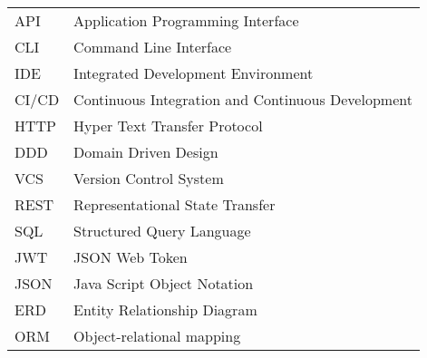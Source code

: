 \begin{longtable}{p{3cm}p{10cm}}
    API&Application Programming Interface\\
    CLI&Command Line Interface\\
    IDE&Integrated Development Environment\\
    CI/CD&Continuous Integration and Continuous Development\\
    HTTP&Hyper Text Transfer Protocol\\
    DDD&Domain Driven Design\\
    VCS&Version Control System\\
    REST&Representational State Transfer\\
    SQL&Structured Query Language\\
    JWT&JSON Web Token\\
    JSON&Java Script Object Notation\\
    ERD&Entity Relationship Diagram\\
    ORM&Object-relational mapping\\
\end{longtable}
\addtocounter{table}{-1}
